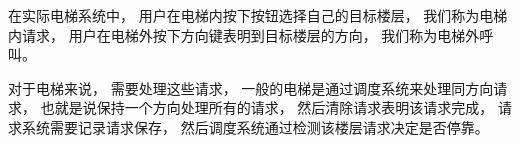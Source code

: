 \documentclass[../main.tex]{subfiles} %
\begin{document}
在实际电梯系统中，
用户在电梯内按下按钮选择自己的目标楼层，
我们称为电梯内请求，
用户在电梯外按下方向键表明到目标楼层的方向，
我们称为电梯外呼叫。

对于电梯来说，
需要处理这些请求，
一般的电梯是通过调度系统来处理同方向请求，
也就是说保持一个方向处理所有的请求，
然后清除请求表明该请求完成，
请求系统需要记录请求保存，
然后调度系统通过检测该楼层请求决定是否停靠。
\end{document}
